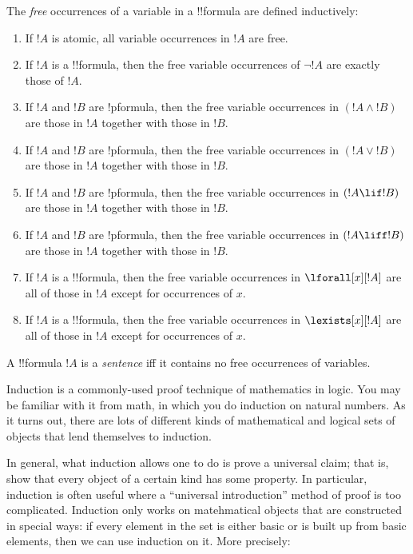 \documentclass[../../include/open-logic-section]{subfiles}
\begin{document}


\begin{defn}
The \emph{free} occurrences of a variable in a !!{formula} are defined
inductively:
\begin{enumerate}
\item If $!A$ is atomic, all variable occurrences in $!A$ are free.
\item If $!A$ is a !!{formula}, then the free variable occurrences of
  $\lnot !A$ are exactly those of $!A$.
\item If $!A$ and $!B$ are !p{formula}, then the free variable
  occurrences in $(!A \land !B)$ are those in $!A$ together with those
  in $!B$.
\item If $!A$ and $!B$ are !p{formula}, then the free variable
  occurrences in $(!A \lor !B)$ are those in $!A$ together with those
  in $!B$.
\item If $!A$ and $!B$ are !p{formula}, then the free variable
  occurrences in $(!A \lif !B)$ are those in $!A$ together with those
  in $!B$.
\item If $!A$ and $!B$ are !p{formula}, then the free variable
  occurrences in $(!A \liff !B)$ are those in $!A$ together with those
  in $!B$.
\item If $!A$ is a !!{formula}, then the free variable occurrences in
  $\lforall[x][!A]$ are all of those in $!A$ except for occurrences of
  $x$.
\item If $!A$ is a !!{formula}, then the free variable occurrences in
  $\lexists[x][!A]$ are all of those in $!A$ except for occurrences of
  $x$.
\end{enumerate}
\end{defn}

\begin{defn}[Sentence]
A !!{formula} $!A$ is a \emph{sentence} iff it contains no free
occurrences of variables.
\end{defn}

\begin{explain}
Induction is a commonly-used proof technique of mathematics in logic. 
You may be familiar with it from math, in which you do induction on 
natural numbers. As it turns out, there are lots of different kinds of 
mathematical and logical sets of objects that lend themselves to induction.

In general, what induction allows one to do is prove a universal claim; that 
is, show that every object of a certain kind has some property. In particular, 
induction is often useful where a ``universal introduction'' method of proof 
is too complicated. Induction only works on matehmatical objects that are 
constructed in special ways: if every element in the set is either basic or is 
built up from basic elements, then we can use induction on it. More precisely:
\end{explain}
\end{document}
